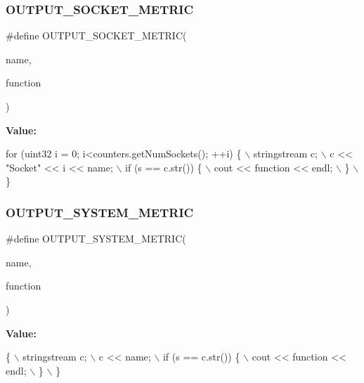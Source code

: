 \subsubsection{\texorpdfstring{O\+U\+T\+P\+U\+T\+\_\+\+S\+O\+C\+K\+E\+T\+\_\+\+M\+E\+T\+R\+IC}{OUTPUT\_SOCKET\_METRIC}}
{\footnotesize\ttfamily \#define O\+U\+T\+P\+U\+T\+\_\+\+S\+O\+C\+K\+E\+T\+\_\+\+M\+E\+T\+R\+IC(\begin{DoxyParamCaption}\item[{}]{name,  }\item[{}]{function }\end{DoxyParamCaption})}

{\bfseries Value\+:}
\begin{DoxyCode}
\textcolor{keywordflow}{for} (uint32 i = 0; i<counters.getNumSockets(); ++i) \{ \(\backslash\)
                             stringstream c; \(\backslash\)
                             c << \textcolor{stringliteral}{"Socket"} << i << name; \(\backslash\)
                             if (s == c.str()) \{ \(\backslash\)
                                 cout << \textcolor{keyword}{function} << endl; \(\backslash\)
                             \} \(\backslash\)
                         \}
\end{DoxyCode}
\mbox{\label{pcm-sensor_8cpp_a726c566daab6b237bf1c8d3776efdd40}} 
\subsubsection{\texorpdfstring{O\+U\+T\+P\+U\+T\+\_\+\+S\+Y\+S\+T\+E\+M\+\_\+\+M\+E\+T\+R\+IC}{OUTPUT\_SYSTEM\_METRIC}}
{\footnotesize\ttfamily \#define O\+U\+T\+P\+U\+T\+\_\+\+S\+Y\+S\+T\+E\+M\+\_\+\+M\+E\+T\+R\+IC(\begin{DoxyParamCaption}\item[{}]{name,  }\item[{}]{function }\end{DoxyParamCaption})}

{\bfseries Value\+:}
\begin{DoxyCode}
\{ \(\backslash\)
        stringstream c; \(\backslash\)
        c << name; \(\backslash\)
        if (s == c.str()) \{ \(\backslash\)
            cout << \textcolor{keyword}{function} << endl; \(\backslash\)
        \} \(\backslash\)
    \}
\end{DoxyCode}
